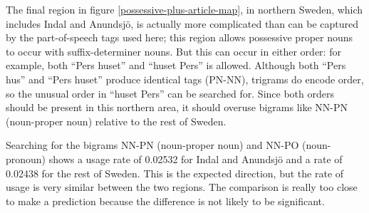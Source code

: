The final region in figure \ref{possessive-plus-article-map}, in northern
Sweden, which includes Indal and Anundsj\"o, is actually more
complicated than can be captured by the part-of-speech tags used here;
this region allows possessive proper nouns to occur with
suffix-determiner nouns. But this can occur in either order: for
example, both ``Pers huset'' and ``huset Pers'' is allowed. Although
both ``Pers hus'' and ``Pers huset'' produce identical tags (PN-NN),
trigrams do encode order, so the unusual order in ``huset Pers'' can be
searched for. Since both orders should be present in this northern
area, it should overuse bigrams like NN-PN (noun-proper noun) relative
to the rest of Sweden.

Searching for the bigrams NN-PN (noun-proper noun) and NN-PO
(noun-pronoun) shows a usage rate of 0.02532 for Indal and Anundsj\"o
and a rate of 0.02438 for the rest of Sweden. This is the expected
direction, but the rate of usage is very similar between the two
regions. The comparison is really too close to make a prediction
because the difference is not likely to be significant.





